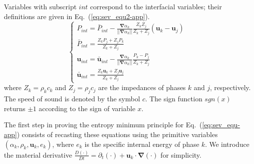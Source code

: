 \documentclass[preprint,10pt]{elsarticle}
\newcommand{\grad}{\mbold{\nabla}}
\newcommand{\mbold}[1]{\boldsymbol#1}
\newcommand{\eqt}[1]{Eq.~(\ref{#1})}                     %
\begin{document}
\begin{appendices}
Variables with subscript ${int}$ correspond to the interfacial variables; their definitions are given in \eqt{eq:sev_equ2-app}. 
\begin{equation}
\label{eq:sev_equ2-app}
\left\{
\begin{array}{lll}
P_{int} = \bar{P}_{int} - \frac{\grad \alpha_k}{|| \grad \alpha_k ||} \frac{Z_k Z_j}{Z_k + Z_j} \left( \mbold u_k-\mbold u_j \right) \\
\bar{P}_{int} = \frac{Z_k P_j + Z_j P_k}{Z_k + Z_j} \\
\mbold u_{int} = \bar{\mbold u}_{int} - \frac{\grad \alpha_k}{|| \grad \alpha_k ||} \frac{P_k - P_j}{Z_k + Z_j} \\
\bar{\mbold u}_{int} = \frac{Z_k \mbold u _k + Z_j \mbold u_j}{Z_k + Z_j}
\end{array}
\right.
\end{equation}
where $Z_k = \rho_k c_k$ and $Z_j = \rho_j c_j$ are the impedances of phases $k$ and $j$, respectively. The speed of sound is denoted by the symbol $c$. The sign function $sgn(x)$ returns $\pm 1$ according to the sign of variable $x$.

The first step in proving the entropy minimum principle for \eqt{eq:sev_equ-app} 
consists of recasting these equations using the primitive variables $(\alpha_k, \rho_k, \mbold u_k, e_k)$, where $e_k$ is the specific internal energy of phase $k$. We introduce the material derivative $\frac{D (\cdot)}{Dt} = \partial_t (\cdot) + \mbold u_k \cdot \grad (\cdot)$ for simplicity. 


\end{appendices}
\end{document}
